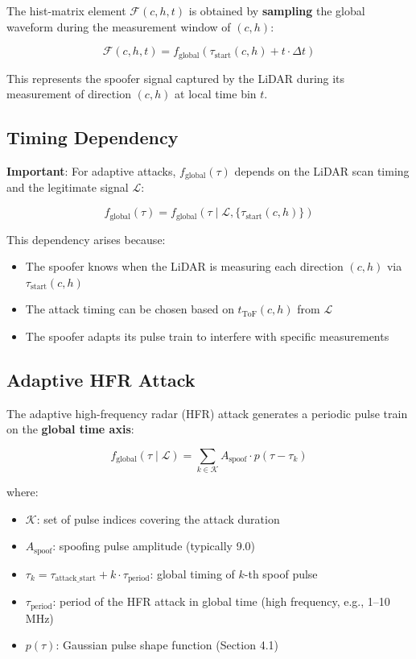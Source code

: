 \documentclass[11pt]{article}
\begin{document}
The hist-matrix element $\mathcal{F}(c, h, t)$ is obtained by \textbf{sampling} the global waveform during the measurement window of $(c, h)$:

\begin{equation}
\mathcal{F}(c, h, t) = f_{\text{global}}(\tau_{\text{start}}(c, h) + t \cdot \Delta t)
\end{equation}

This represents the spoofer signal captured by the LiDAR during its measurement of direction $(c, h)$ at local time bin $t$.

\subsection{Timing Dependency}

\textbf{Important}: For adaptive attacks, $f_{\text{global}}(\tau)$ depends on the LiDAR scan timing and the legitimate signal $\bm{\mathcal{L}}$:

\begin{equation}
f_{\text{global}}(\tau) = f_{\text{global}}(\tau \mid \bm{\mathcal{L}}, \{\tau_{\text{start}}(c, h)\})
\end{equation}

This dependency arises because:
\begin{itemize}
    \item The spoofer knows when the LiDAR is measuring each direction $(c, h)$ via $\tau_{\text{start}}(c, h)$
    \item The attack timing can be chosen based on $t_{\text{ToF}}(c, h)$ from $\bm{\mathcal{L}}$
    \item The spoofer adapts its pulse train to interfere with specific measurements
\end{itemize}

\subsection{Adaptive HFR Attack}

The adaptive high-frequency radar (HFR) attack generates a periodic pulse train on the \textbf{global time axis}:

\begin{equation}
f_{\text{global}}(\tau \mid \bm{\mathcal{L}}) = \sum_{k \in \mathcal{K}} A_{\text{spoof}} \cdot p(\tau - \tau_k)
\end{equation}

where:
\begin{itemize}
    \item $\mathcal{K}$: set of pulse indices covering the attack duration
    \item $A_{\text{spoof}}$: spoofing pulse amplitude (typically 9.0)
    \item $\tau_k = \tau_{\text{attack\_start}} + k \cdot \tau_{\text{period}}$: global timing of $k$-th spoof pulse
    \item $\tau_{\text{period}}$: period of the HFR attack in global time (high frequency, e.g., 1--10 MHz)
    \item $p(\tau)$: Gaussian pulse shape function (Section 4.1)
\end{itemize}
\end{document}
